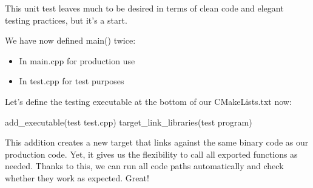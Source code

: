 This unit test leaves much to be desired in terms of clean code and elegant testing practices, but it’s a start.

We have now defined main() twice:

\begin{itemize}
\item
In main.cpp for production use

\item
In test.cpp for test purposes
\end{itemize}

Let’s define the testing executable at the bottom of our CMakeLists.txt now:

\begin{cmake}
add_executable(test test.cpp)
target_link_libraries(test program)
\end{cmake}

This addition creates a new target that links against the same binary code as our production code. Yet, it gives us the flexibility to call all exported functions as needed. Thanks to this, we can run all code paths automatically and check whether they work as expected. Great!















